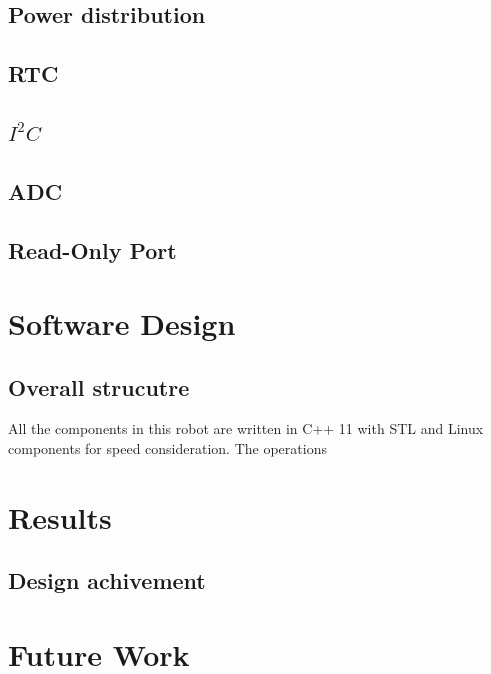     \subsection{Power distribution}
    \subsection{RTC}
    \subsection{$I^{2}C$}
    \subsection{ADC}
    \subsection{Read-Only Port}

    
           

\newpage
\section{Software Design}


    \subsection{Overall strucutre}
    All the components in this robot are written in C++ 11 with STL and Linux components for speed consideration. The operations 
\section{Results}
    \subsection{Design achivement}
       

\section{Future Work}




\newpage
